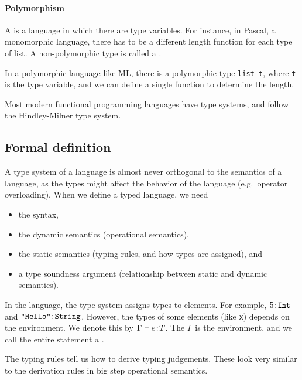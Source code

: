 \documentclass[class=scrartcl]{standalone}
\begin{document}
\paragraph{Polymorphism}
A  is a language in which
there are type variables.
For instance, in Pascal, a monomorphic language,
there has to be a different length function for each type of list.
A non-polymorphic type is called a .

In a polymorphic language like ML, there is a polymorphic type
\texttt{list t}, where \texttt{t} is the type variable,
and we can define a single function to determine the length.

Most modern functional programming languages have type systems,
and follow the Hindley-Milner type system.

\subsection{Formal definition}
A type system of a language is almost never orthogonal
to the semantics of a language, as the types might affect
the behavior of the language (e.g.\ operator overloading).
When we define a typed language, we need
\begin{itemize}[nosep]
  \item the syntax,
  \item the dynamic semantics (operational semantics),
  \item the static semantics (typing rules, and how types are assigned), and
  \item a type soundness argument
        (relationship between static and dynamic semantics).
\end{itemize}

In the language, the type system assigns types to elements.
For example, \(5 {\hspace{0.1111em}:\hspace{0.1111em}} \texttt{Int}\)
and \(\texttt{"Hello"} {\hspace{0.1111em}:\hspace{0.1111em}} \texttt{String}\). %
However, the types of some elements (like \texttt{x})
depends on the environment.
We denote this by \(\Gamma \vdash e {\hspace{0.1111em}:\hspace{0.1111em}} T\).
The \(\Gamma\) is the environment,
and we call the entire statement a .

The typing rules tell us how to derive typing judgements.
These look very similar to the derivation rules
in big step operational semantics.
\end{document}
